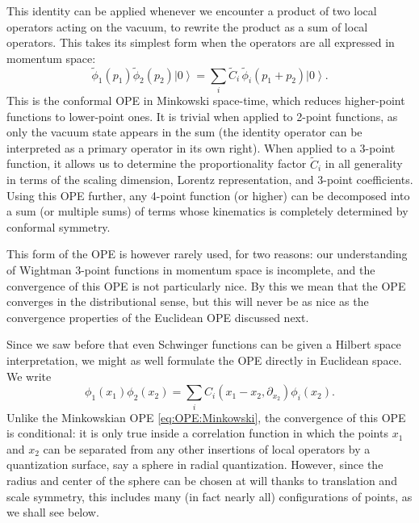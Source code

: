\documentclass[a4paper,12pt]{article}
\newcommand{\ket}[1]{\left| #1 \right\rangle}
\numberwithin{equation}{section}
\begin{document}
This identity can be applied whenever we encounter a product of two local operators acting on the vacuum, to rewrite the product as a sum of local operators. This takes its simplest form when the operators are all expressed in momentum space:
\begin{equation}
	\widetilde{\phi}_1(p_1) \widetilde{\phi}_2(p_2) \ket{0}
	= \sum_i \widetilde{C}_i \, \widetilde{\phi}_i(p_1 + p_2) \ket{0}.
	\label{eq:OPE:Minkowski}
\end{equation}
This is the conformal OPE in Minkowski space-time, which reduces higher-point functions to lower-point ones. It is trivial when applied to 2-point functions, as only the vacuum state appears in the sum (the identity operator can be interpreted as a primary operator in its own right). When applied to a 3-point function, it allows us to determine the proportionality factor $\widetilde{C}_i$ in all generality in terms of the scaling dimension, Lorentz representation, and 3-point coefficients. Using this OPE further, any 4-point function (or higher) can be decomposed into a sum (or multiple sums) of terms whose kinematics is completely determined by conformal symmetry.

This form of the OPE is however rarely used, for two reasons: our understanding of Wightman 3-point functions in momentum space is incomplete, and the convergence of this OPE is not particularly nice. By this we mean that the OPE converges in the distributional sense, but this will never be as nice as the convergence properties of the Euclidean OPE discussed next.

Since we saw before that even Schwinger functions can be given a Hilbert space interpretation, we might as well formulate the OPE directly in Euclidean space. We write
\begin{equation}
	\phi_1(x_1) \phi_2(x_2) = \sum_i
	C_i\left( x_1 - x_2, \partial_{x_2} \right) \phi_i(x_2).
	\label{eq:OPE:Euclidean}
\end{equation}
Unlike the Minkowskian OPE \eqref{eq:OPE:Minkowski}, the convergence of this OPE is conditional: it is only true inside a correlation function in which the points $x_1$ and $x_2$ can be separated from any other insertions of local operators by a quantization surface, say a sphere in radial quantization. However, since the radius and center of the sphere can be chosen at will thanks to translation and scale symmetry, this includes many (in fact nearly all) configurations of points, as we shall see below.
\end{document}
